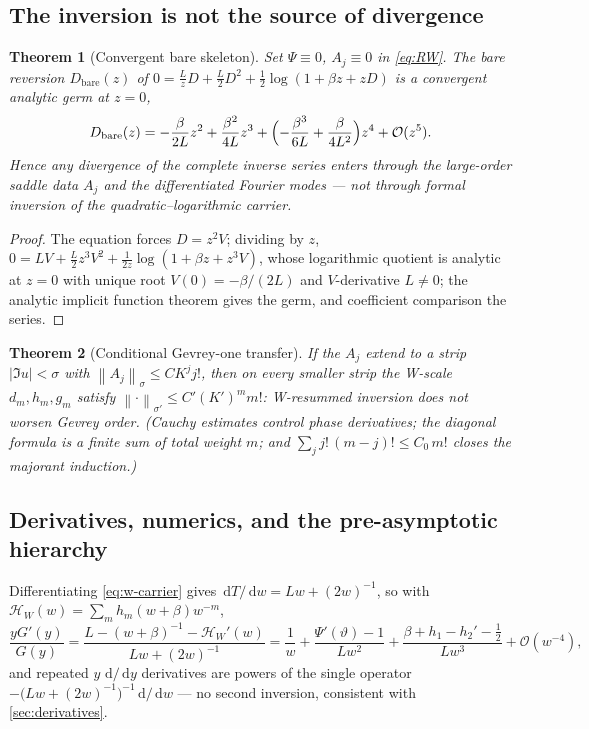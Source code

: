 \documentclass[11pt,oneside]{article}
\numberwithin{equation}{section}
\newtheorem{theorem}{Theorem}[section]
\theoremstyle{definition}
\theoremstyle{remark}
\newcommand{\dd}{\,\mathrm d}
\newcommand{\bigO}{\mathcal O}
\newcommand{\abs}[1]{\left\lvert #1\right\rvert}
\newcommand{\norm}[1]{\left\lVert #1\right\rVert}
\begin{document}
\subsection{The inversion is not the source of divergence}

\begin{theorem}[Convergent bare skeleton]
\label{thm:bare-skeleton}
Set $\Psi\equiv0$, $A_j\equiv0$ in \eqref{eq:RW}.  The bare reversion
$D_{\mathrm{bare}}(z)$ of
$0=\tfrac LzD+\tfrac L2D^{2}
+\tfrac12\log(1+\beta z+zD)$ is a \emph{convergent} analytic germ at
$z=0$,
\begin{equation}
 D_{\mathrm{bare}}(z)
 =-\frac{\beta}{2L}z^{2}
 +\frac{\beta^{2}}{4L}z^{3}
 +\Bigl(-\frac{\beta^{3}}{6L}+\frac{\beta}{4L^{2}}\Bigr)z^{4}
 +\bigO(z^{5}).
 \label{eq:bare-series}
\end{equation}
Hence any divergence of the complete inverse series enters through
the large-order saddle data $A_j$ and the differentiated Fourier
modes --- not through formal inversion of the
quadratic--logarithmic carrier.
\end{theorem}

\begin{proof}
The equation forces $D=z^{2}V$; dividing by $z$,
$0=LV+\tfrac L2z^{3}V^{2}
+\tfrac1{2z}\log(1+\beta z+z^{3}V)$, whose logarithmic quotient is
analytic at $z=0$ with unique root $V(0)=-\beta/(2L)$ and
$V$-derivative $L\ne0$; the analytic implicit function theorem gives
the germ, and coefficient comparison the series.
\end{proof}

\begin{theorem}[Conditional Gevrey-one transfer]
\label{thm:gevrey-transfer}
If the $A_j$ extend to a strip $\abs{\Im u}<\sigma$ with
$\norm{A_j}_\sigma\le CK^{j}j!$, then on every smaller strip the
W-scale $d_m,h_m,g_m$ satisfy
$\norm\cdot_{\sigma'}\le C'(K')^{m}m!$: W-resummed inversion does not
worsen Gevrey order.  (Cauchy estimates control phase derivatives;
the diagonal formula is a finite sum of total weight $m$; and
$\sum_jj!\,(m-j)!\le C_0\,m!$ closes the majorant induction.)
\end{theorem}

\subsection{Derivatives, numerics, and the pre-asymptotic hierarchy}

Differentiating \eqref{eq:w-carrier} gives
$\dd T/\dd w=Lw+(2w)^{-1}$, so with
$\mathcal H_W(w)=\sum_mh_m(w+\beta)w^{-m}$,
\begin{equation}
 \frac{yG'(y)}{G(y)}
 =\frac{L-(w+\beta)^{-1}-\mathcal H_W'(w)}{Lw+(2w)^{-1}}
 =\frac1w+\frac{\Psi'(\vartheta)-1}{Lw^{2}}
 +\frac{\beta+h_1-h_2'-\tfrac12}{Lw^{3}}
 +\bigO(w^{-4}),
 \label{eq:W-elasticity}
\end{equation}
and repeated $y\,\dd/\dd y$ derivatives are powers of the single
operator $-\bigl(Lw+(2w)^{-1}\bigr)^{-1}\dd/\dd w$ --- no second
inversion, consistent with \cref{sec:derivatives}.
\end{document}
